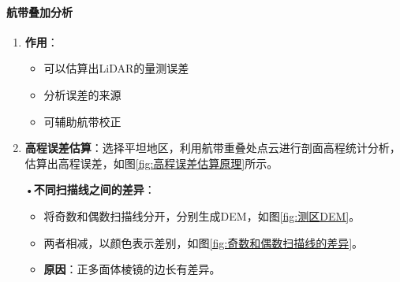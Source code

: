 \paragraph{航带叠加分析}
\begin{enumerate}
	\item \textbf{作用}：
		\begin{itemize}
			\item 可以估算出LiDAR的量测误差
			\item 分析误差的来源
			\item 可辅助航带校正
		\end{itemize}
	\item \textbf{高程误差估算}：选择平坦地区，利用航带重叠处点云进行剖面高程统计分析，估算出高程误差，如图\ref{fig:高程误差估算原理}所示。
	
		•\textbf{不同扫描线之间的差异}：
		\begin{itemize}
			\item 将奇数和偶数扫描线分开，分别生成DEM，如图\ref{fig:测区DEM}。
			\item 两者相减，以颜色表示差别，如图\ref{fig:奇数和偶数扫描线的差异}。
			\item \textbf{原因}：正多面体棱镜的边长有差异。
		\end{itemize}
		\begin{figure}[htbp]
			\centering

\end{figure}
\end{enumerate}
